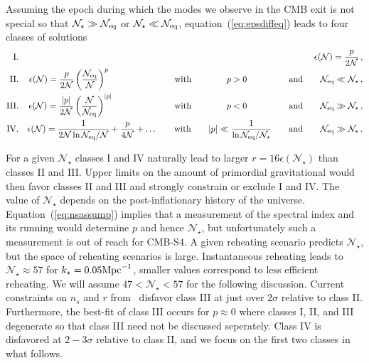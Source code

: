 Assuming the epoch during which the modes we observe in the CMB exit is not special so that $\mathcal{N}_\star\gg\mathcal{N}_{\rm eq}$ or $\mathcal{N}_\star\ll\mathcal{N}_{\rm eq}$, equation~(\ref{eq:epsdiffeq}) leads to four classes of solutions
\begin{eqnarray}
{\rm I.}&&\epsilon(\mathcal{N})=\frac{p}{2\mathcal{N}}\,,\\
{\rm II.}&&\epsilon(\mathcal{N})=\frac{p}{2\mathcal{N}}\left(\frac{\mathcal{N}_{\rm eq}}{\mathcal{N}}\right)^p\hspace{1.92cm}\qquad{\rm with}\qquad \hspace{7.3mm}p>0 \hspace{1.0cm}\qquad{\rm and}\qquad\mathcal{N}_{\rm eq}\ll\mathcal{N}_\star\,,\\
{\rm III.}&&\epsilon(\mathcal{N})=\frac{|p|}{2\mathcal{N}}\left(\frac{\mathcal{N}}{\mathcal{N}_{\rm eq}}\right)^{|p|}\hspace{1.77cm}\qquad{\rm with}\qquad \hspace{7.3mm}p<0 \hspace{1.0cm}\qquad{\rm and}\qquad\mathcal{N}_{\rm eq}\gg\mathcal{N}_\star\,,\\
{\rm IV.}&&\epsilon(\mathcal{N})=\frac{1}{2\mathcal{N}\ln\mathcal{N}_{\rm eq}/\mathcal{N}}+\frac{p}{4\mathcal{N}}+\dots\qquad{\rm with}\qquad |p|\ll\frac{1}{\ln\mathcal{N}_{\rm eq}/\mathcal{N}_\star}\qquad{\rm and}\qquad \mathcal{N}_{\rm eq}\gg\mathcal{N}_\star\,.
\end{eqnarray}

For a given $\mathcal{N}_\star$ classes I and IV naturally lead to larger $r= 16\epsilon(\mathcal{N}_\star)$ than classes II and III. Upper limits on the amount of primordial gravitational would then favor classes II and III and strongly constrain or exclude I and IV. The value of $\mathcal{N}_\star$ depends on the post-inflationary history of the universe. Equation~(\ref{eq:nsassump}) implies that a measurement of the spectral index and its running would determine $p$ and hence $\mathcal{N}_\star$, but unfortunately such a measurement is out of reach for CMB-S4. A given reheating scenario predicts $\mathcal{N}_\star$, but the space of reheating scenarios is large. Instantaneous reheating leads to $\mathcal{N}_\star\approx 57$ for $k_\star=0.05 {\rm Mpc}^{-1}$, smaller values correspond to less efficient reheating. We will assume $47<\mathcal{N}_\star<57$ for the following discussion. Current constraints on $n_s$ and $r$ from~\cite{bicepkeckplanck15} disfavor class III at just over $2\sigma$ relative to class II. Furthermore, the best-fit of class III occurs for $p\approx 0$ where classes I, II, and III degenerate so that class III need not be discussed seperately. Class IV is disfavored at $2-3\sigma$ relative to class II, and we focus on the first two classes in what follows.

